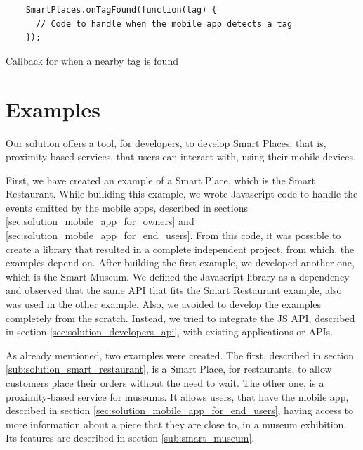 \begin{listing}[H]
  \begin{verbatim}
    SmartPlaces.onTagFound(function(tag) {
      // Code to handle when the mobile app detects a tag
    });
  \end{verbatim}
  \caption[Tag found]{Callback for when a nearby tag is found}
  \label{code:smartplaces_tag_found}
\end{listing}

\section{Examples}
\label{sec:solution_examples}
Our solution offers a tool, for developers, to develop Smart Places, that is, proximity-based services, that users can interact with, using their mobile devices.

First, we have created an example of a Smart Place, which is the Smart Restaurant.
While builiding this example, we wrote Javascript code to handle the events emitted by the mobile apps, described in sections \ref{sec:solution_mobile_app_for_owners} and \ref{sec:solution_mobile_app_for_end_users}.
From this code, it was possible to create a library that resulted in a complete independent project, from which, the examples depend on.
After building the first example, we developed another one, which is the Smart Museum.
We defined the Javascript library as a dependency and observed that the same \gls{API} that fits the Smart Restaurant example, also was used in the other example.
Also, we avoided to develop the examples completely from the scratch.
Instead, we tried to integrate the \gls{JS} \gls{API}, described in section \ref{sec:solution_developers_api}, with existing applications or \glspl{API}.

As already mentioned, two examples were created.
The first, described in section \ref{sub:solution_smart_restaurant}, is a Smart Place, for restaurants, to allow customers place their orders without the need to wait.
The other one, is a proximity-based service for museums.
It allows users, that have the mobile app, described in section \ref{sec:solution_mobile_app_for_end_users}, having access to more information about a piece that they are close to, in a museum exhibition.
Its features are described in section \ref{sub:smart_museum}.

